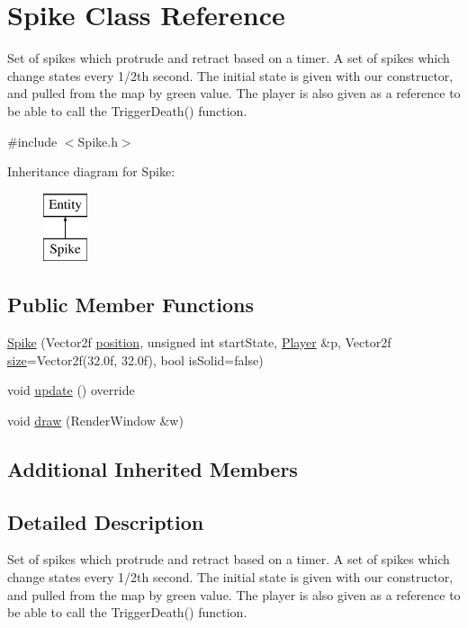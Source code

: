 \hypertarget{class_spike}{}\section{Spike Class Reference}
\label{class_spike}


Set of spikes which protrude and retract based on a timer. A set of spikes which change states every 1/2th second. The initial state is given with our constructor, and pulled from the map by green value. The player is also given as a reference to be able to call the Trigger\+Death() function.  




{\ttfamily \#include $<$Spike.\+h$>$}

Inheritance diagram for Spike\+:\begin{figure}[H]
\begin{center}
\leavevmode
\includegraphics[height=2.000000cm]{class_spike}
\end{center}
\end{figure}
\subsection*{Public Member Functions}
\begin{DoxyCompactItemize}
\item 
\hyperlink{class_spike_a7dd2800abd43bbde613116eded656144}{Spike} (Vector2f \hyperlink{class_entity_a6af9d6498134ad0906011778bc5736db}{position}, unsigned int start\+State, \hyperlink{class_player}{Player} \&p, Vector2f \hyperlink{class_entity_ae9a0a364c85f91ade5088b3610131417}{size}=Vector2f(32.\+0f, 32.\+0f), bool is\+Solid=false)
\item 
void \hyperlink{class_spike_a5f1fc626e9f58f4a08a002c6d2549942}{update} () override
\item 
void \hyperlink{class_spike_a6f1baae74e1b5140459d2a439ad01547}{draw} (Render\+Window \&w)
\end{DoxyCompactItemize}
\subsection*{Additional Inherited Members}


\subsection{Detailed Description}
Set of spikes which protrude and retract based on a timer. A set of spikes which change states every 1/2th second. The initial state is given with our constructor, and pulled from the map by green value. The player is also given as a reference to be able to call the Trigger\+Death() function. 

